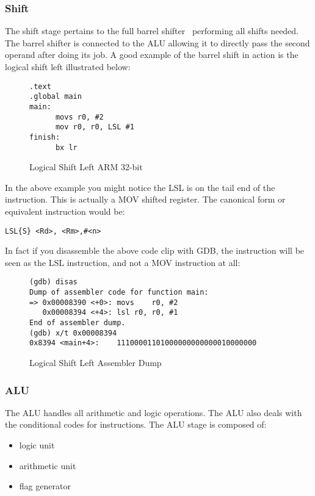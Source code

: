 \documentclass[11pt]{report}
\begin{document}
\subsubsection{Shift}
\begin{onehalfspace}
The shift stage pertains to the full barrel shifter~\citep{davespace} performing all shifts needed. The barrel shifter is connected to the ALU allowing it to directly pass the second operand after doing its job. A good example of the barrel shift in action is the logical shift left illustrated below:
\begin{figure}[H]
\begin{verbatim}
.text
.global main
main:
      movs r0, #2
      mov r0, r0, LSL #1
finish:
      bx lr
\end{verbatim}
\caption{Logical Shift Left ARM 32-bit}

\end{figure}
In the above example you might notice the LSL is on the tail end of the instruction. This is actually a MOV shifted register. The canonical form or equivalent instruction would be:
\begin{verbatim}
LSL{S} <Rd>, <Rm>,#<n>
\end{verbatim}
In fact if you disassemble the above code clip with GDB, the instruction will be seen as the LSL instruction, and not a MOV instruction at all:
\begin{figure}[H]
\begin{verbatim}
(gdb) disas
Dump of assembler code for function main:
=> 0x00008390 <+0>:	movs	r0, #2
   0x00008394 <+4>:	lsl	r0, r0, #1
End of assembler dump.
(gdb) x/t 0x00008394
0x8394 <main+4>:	11100001101000000000000010000000
\end{verbatim}

\caption{Logical Shift Left Assembler Dump}
\end{figure}
\subsubsection{ALU}
The ALU handles all arithmetic and logic operations. The ALU also deals with the conditional codes for instructions. The ALU stage is composed of:
\end{onehalfspace}
\begin{itemize}
\item logic unit
\item arithmetic unit
\item flag generator
\end{itemize}
\end{document}
